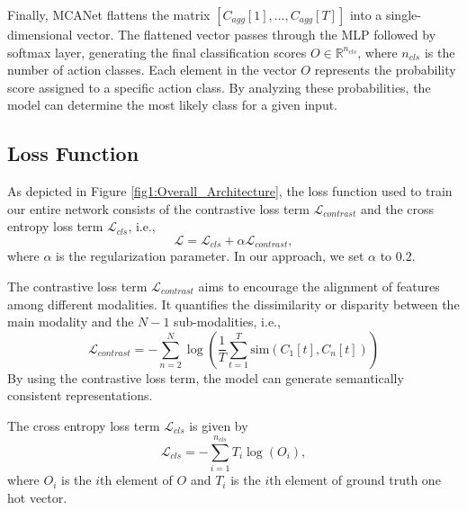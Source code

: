 
Finally, MCANet flattens the matrix $[{C}_{agg}[1], ..., {C}_{agg}[T]] $ into a single-dimensional vector. The flattened vector passes through the MLP followed by softmax layer, generating the final classification scores $O\in \mathbb{R}^{n_{cls}}$, where $n_{cls}$ is the number of action classes. Each element in the vector $O$ represents the probability score assigned to a specific action class. By analyzing these probabilities, the model can determine the most likely class for a given input.

\subsection{Loss Function}
As depicted in Figure \ref{fig1:Overall_Architecture}, the loss function used to train our entire network consists of the contrastive loss term $\mathcal{L}_{contrast}$ and the cross entropy loss term $\mathcal{L}_{cls}$, i.e.,  
\begin{equation}
\mathcal{L} = \mathcal{L}_{cls} + \alpha \mathcal{L}_{contrast},
\end{equation}
where $\alpha$ is the regularization parameter. In our approach, we set $\alpha$ to 0.2.

The contrastive loss term $\mathcal{L}_{contrast}$ aims to encourage the alignment of features among different modalities. It quantifies the dissimilarity or disparity between the main modality and the $N-1$ sub-modalities, i.e.,  
\begin{equation}
\label{eq:diff_loss}
    \mathcal{L}_{contrast} = - \sum_{n=2}^{N} \log \left(\frac{1}{T}\sum_{t=1}^{T}\mathrm{sim}(C_{1}[t],C_{n}[t])\right)
\end{equation}
By using the contrastive loss term, the model can generate semantically consistent representations. 

The cross entropy loss term $\mathcal{L}_{cls}$ is given by
\begin{equation}
\mathcal{L}_{cls} = - \sum_{i = 1}^{n_{cls}}{T_{i}\log(O_{i})},
\end{equation}
where $O_i$ is the $i$th element of $O$ and $T_i$ is the $i$th element of ground truth one hot vector.  

